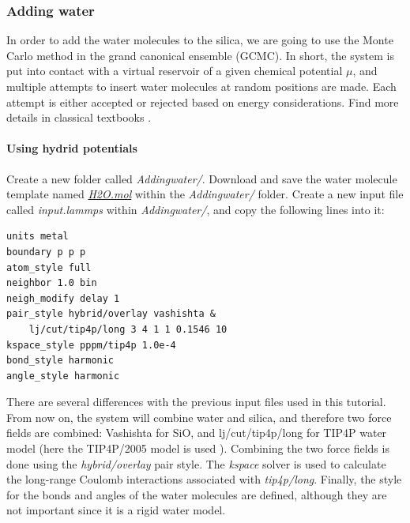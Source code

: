 \documentclass[9pt,tutorial]{livecoms}
\begin{document}
\subsubsection{Adding water}
\noindent In order to add the water molecules to the silica, we are going to use the Monte Carlo method in the grand canonical ensemble (GCMC). In short, the system is put into contact with a virtual reservoir of a given chemical potential $\mu$, and multiple attempts to insert water molecules at random positions are made. Each attempt is either accepted or rejected based on energy considerations. Find more details in classical textbooks \cite{frenkel2023understanding}.

\paragraph{Using hydrid potentials}
\noindent Create a new folder called \textit{Addingwater/}. Download and save the water molecule template named \href{https://raw.githubusercontent.com/lammpstutorials/lammpstutorials-article/main/files/tutorial6/H2O.mol}{\textit{H2O.mol}} within the \textit{Addingwater/} folder. Create a new input file called \textit{input.lammps} within \textit{Addingwater/}, and copy the following lines into it:
{\normalsize \begin{verbatim}
units metal
boundary p p p
atom_style full
neighbor 1.0 bin
neigh_modify delay 1
pair_style hybrid/overlay vashishta &
    lj/cut/tip4p/long 3 4 1 1 0.1546 10
kspace_style pppm/tip4p 1.0e-4
bond_style harmonic
angle_style harmonic
\end{verbatim}}
There are several differences with the previous input files used in this tutorial. From now on, the system will combine water and silica, and therefore two force fields are combined: Vashishta for SiO, and lj/cut/tip4p/long for TIP4P water model (here 
the TIP4P/2005 model is used \cite{abascal2005general}). Combining the two force fields is done using the \textit{hybrid/overlay} pair style. The \textit{kspace} solver is used to calculate the long-range Coulomb interactions associated with \textit{tip4p/long}. Finally, the style for the bonds and angles of the water molecules are defined, although they are not important since it is a rigid water model.
\end{document}
